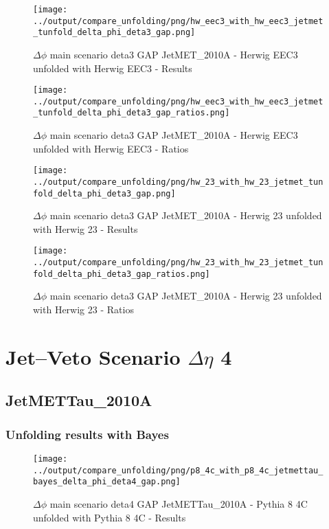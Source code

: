 \documentclass[11pt]{book}
\begin{document}
\begin{figure}[ht]
\centering
\texttt{[image: ../output/compare\_unfolding/png/hw\_eec3\_with\_hw\_eec3\_jetmet\_tunfold\_delta\_phi\_deta3\_gap.png]}
\caption{$\Delta\phi$ main scenario deta3 GAP JetMET\_2010A - Herwig EEC3 unfolded with Herwig EEC3 - Results}
\label{hw_eec3_hw_eec3_jetmet_tunfold_delta_phi_deta3_gap_a}
\end{figure}

\begin{figure}[ht]
\centering
\texttt{[image: ../output/compare\_unfolding/png/hw\_eec3\_with\_hw\_eec3\_jetmet\_tunfold\_delta\_phi\_deta3\_gap\_ratios.png]}
\caption{$\Delta\phi$ main scenario deta3 GAP JetMET\_2010A - Herwig EEC3 unfolded with Herwig EEC3 - Ratios}
\label{hw_eec3_hw_eec3_jetmet_tunfold_delta_phi_deta3_gap_b}
\end{figure}

\begin{figure}[ht]
\centering
\texttt{[image: ../output/compare\_unfolding/png/hw\_23\_with\_hw\_23\_jetmet\_tunfold\_delta\_phi\_deta3\_gap.png]}
\caption{$\Delta\phi$ main scenario deta3 GAP JetMET\_2010A - Herwig 23 unfolded with Herwig 23 - Results}
\label{hw_23_hw_23_jetmet_tunfold_delta_phi_deta3_gap_a}
\end{figure}

\begin{figure}[ht]
\centering
\texttt{[image: ../output/compare\_unfolding/png/hw\_23\_with\_hw\_23\_jetmet\_tunfold\_delta\_phi\_deta3\_gap\_ratios.png]}
\caption{$\Delta\phi$ main scenario deta3 GAP JetMET\_2010A - Herwig 23 unfolded with Herwig 23 - Ratios}
\label{hw_23_hw_23_jetmet_tunfold_delta_phi_deta3_gap_b}
\end{figure}




\newpage
\chapter{Jet--Veto Scenario $\Delta\eta$ 4}
\section{JetMETTau\_2010A}
\subsection{Unfolding results with Bayes}

\begin{figure}[ht]
\centering
\texttt{[image: ../output/compare\_unfolding/png/p8\_4c\_with\_p8\_4c\_jetmettau\_bayes\_delta\_phi\_deta4\_gap.png]}
\caption{$\Delta\phi$ main scenario deta4 GAP JetMETTau\_2010A - Pythia 8 4C unfolded with Pythia 8 4C - Results}
\label{p8_p8_jetmettau_bayes_delta_phi_deta4_gap_a}
\end{figure}
\end{document}
